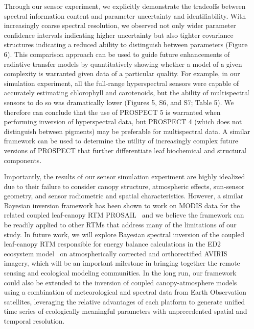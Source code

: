 Through our sensor experiment, we explicitly demonstrate the tradeoffs between spectral information content and parameter uncertainty and identifiability.
With increasingly coarse spectral resolution, we observed not only wider parameter confidence intervals indicating higher uncertainty but also tighter covariance structures indicating a reduced ability to distinguish between parameters (Figure 6). %
This comparison approach can be used to guide future enhancements of radiative transfer models by quantitatively showing whether a model of a given complexity is warranted given data of a particular quality.
For example, in our simulation experiment, all the full-range hyperspectral sensors were capable of accurately estimating chlorophyll and carotenoids, but the ability of multispectral sensors to do so was dramatically lower (Figures 5, S6, and S7; Table 5). %
We therefore can conclude that the use of PROSPECT 5 is warranted when performing inversion of hyperspectral data, but PROSPECT 4 (which does not distinguish between pigments) may be preferable for multispectral data.
A similar framework can be used to determine the utility of increasingly complex future versions of PROSPECT that further differentiate leaf biochemical and structural components.

Importantly, the results of our sensor simulation experiment are highly idealized due to their failure to consider canopy structure, atmospheric effects, sun-sensor geometry, and sensor radiometric and spatial characteristics.
However, a similar Bayesian inversion framework has been shown to work on MODIS data for the related coupled leaf-canopy RTM PROSAIL~\cite{zhang_2005_estimating,zhang_2006_characterization,zhang_2009_satellite,zhang_2012_estimating} and we believe the framework can be readily applied to other RTMs that address many of the limitations of our study.
In future work, we will explore Bayesian spectral inversion of the coupled leaf-canopy RTM responsible for energy balance calculations in the ED2 ecosystem model~\cite{medvigy_2009_mechanistic} on atmospherically corrected and orthorectified AVIRIS imagery,
which will be an important milestone in bringing together the remote sensing and ecological modeling communities.
In the long run, our framework could also be extended to the inversion of coupled canopy-atmosphere models using a combination of meteorological and spectral data from Earth Observation satellites,
leveraging the relative advantages of each platform to generate unified time series of ecologically meaningful parameters with unprecedented spatial and temporal resolution.
